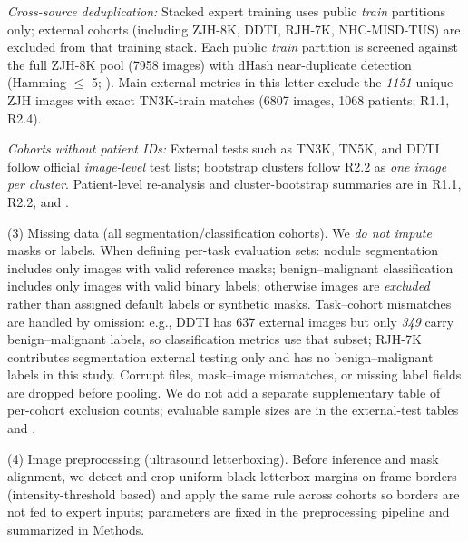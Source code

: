 \begin{authorresponse}
\textit{Cross-source deduplication:} Stacked expert training uses public \emph{train} partitions only; external cohorts (including ZJH-8K, DDTI, RJH-7K, NHC-MISD-TUS) are excluded from that training stack. Each public \emph{train} partition is screened against the full ZJH-8K pool (7958 images) with dHash near-duplicate detection (Hamming $\leq$ 5; ). Main external metrics in this letter exclude the \emph{1151} unique ZJH images with exact TN3K-train matches (6807 images, 1068 patients; R1.1, R2.4).\par
\textit{Cohorts without patient IDs:} External tests such as TN3K, TN5K, and DDTI follow official \emph{image-level} test lists; bootstrap clusters follow R2.2 as \emph{one image per cluster}. Patient-level re-analysis and cluster-bootstrap summaries are in R1.1, R2.2, and .\par
(3) Missing data (all segmentation/classification cohorts). We \emph{do not impute} masks or labels. When defining per-task evaluation sets: nodule segmentation includes only images with valid reference masks; benign--malignant classification includes only images with valid binary labels; otherwise images are \emph{excluded} rather than assigned default labels or synthetic masks. Task--cohort mismatches are handled by omission: e.g., DDTI has 637 external images but only \emph{349} carry benign--malignant labels, so classification metrics use that subset; RJH-7K contributes segmentation external testing only and has no benign--malignant labels in this study. Corrupt files, mask--image mismatches, or missing label fields are dropped before pooling. We do not add a separate supplementary table of per-cohort exclusion counts; evaluable sample sizes are in the external-test tables and .\par
(4) Image preprocessing (ultrasound letterboxing). Before inference and mask alignment, we detect and crop uniform black letterbox margins on frame borders (intensity-threshold based) and apply the same rule across cohorts so borders are not fed to expert inputs; parameters are fixed in the preprocessing pipeline and summarized in Methods.\par
\par
\end{authorresponse}

